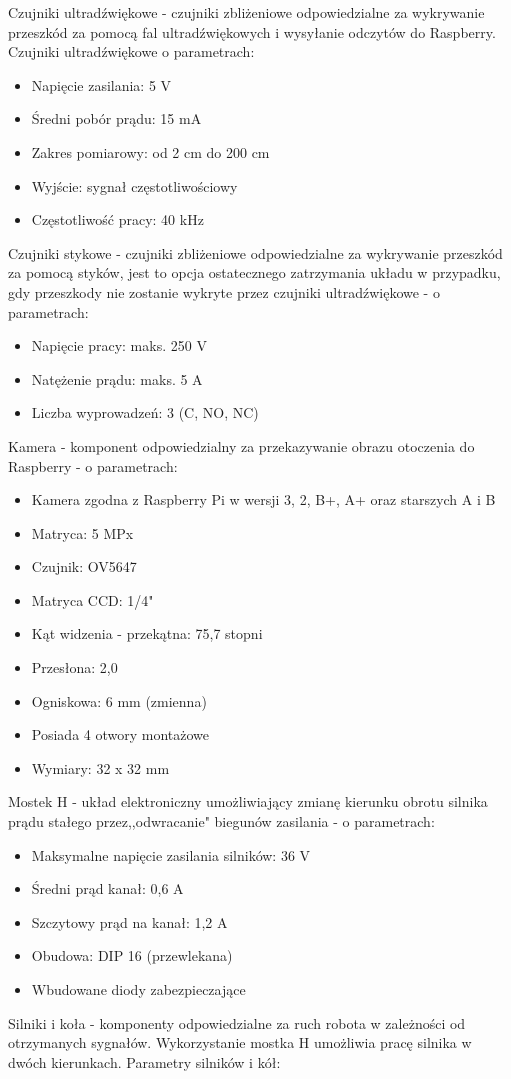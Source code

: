 \documentclass[a4paper]{article}
\begin{document}
Czujniki ultradźwiękowe - czujniki zbliżeniowe odpowiedzialne za wykrywanie przeszkód za pomocą fal ultradźwiękowych i wysyłanie odczytów do Raspberry. Czujniki ultradźwiękowe o parametrach:
\begin{itemize}
\item Napięcie zasilania: 5 V
\item Średni pobór prądu: 15 mA
\item Zakres pomiarowy: od 2 cm do 200 cm
\item Wyjście: sygnał częstotliwościowy
\item Częstotliwość pracy: 40 kHz
\end{itemize}
Czujniki stykowe - czujniki zbliżeniowe odpowiedzialne za wykrywanie przeszkód za pomocą styków, jest to opcja ostatecznego zatrzymania układu w przypadku, gdy przeszkody nie zostanie wykryte przez czujniki ultradźwiękowe - o parametrach:
\begin{itemize}
\item Napięcie pracy: maks. 250 V
\item Natężenie prądu: maks. 5 A
\item Liczba wyprowadzeń: 3 (C, NO, NC)
\end{itemize}
Kamera - komponent odpowiedzialny za przekazywanie obrazu otoczenia do Raspberry - o parametrach:
\begin{itemize}
\item Kamera zgodna z Raspberry Pi w wersji 3, 2, B+, A+ oraz starszych A i B
\item Matryca: 5 MPx
\item Czujnik: OV5647
\item Matryca CCD: 1/4"
\item Kąt widzenia - przekątna: 75,7 stopni
\item Przesłona: 2,0
\item Ogniskowa: 6 mm (zmienna)
\item Posiada 4 otwory montażowe
\item Wymiary: 32 x 32 mm
\end{itemize}
Mostek H - układ elektroniczny umożliwiający zmianę kierunku obrotu silnika prądu stałego przez,,odwracanie" biegunów zasilania - o parametrach:
\begin{itemize}
\item Maksymalne napięcie zasilania silników: 36 V
\item Średni prąd kanał: 0,6 A
\item Szczytowy prąd na kanał: 1,2 A
\item Obudowa: DIP 16 (przewlekana)
\item Wbudowane diody zabezpieczające
\end{itemize}
Silniki i koła - komponenty odpowiedzialne za ruch robota w zależności od otrzymanych sygnałów.
Wykorzystanie mostka H umożliwia pracę silnika w dwóch kierunkach. Parametry silników i kół:
\end{document}
